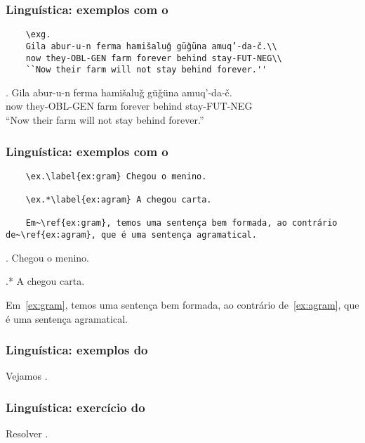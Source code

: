 \begin{frame}[fragile]
  \frametitle{Linguística: exemplos com o }
  \small

  \begin{verbatim}
    \exg.
    Gila abur-u-n ferma hamišaluǧ güǧüna amuq’-da-č.\\
    now they-OBL-GEN farm forever behind stay-FUT-NEG\\
    ``Now their farm will not stay behind forever.''
  \end{verbatim}

  \exg.
  Gila abur-u-n ferma hamišaluǧ güǧüna amuq’-da-č.\\
  now they-OBL-GEN farm forever behind stay-FUT-NEG\\
  ``Now their farm will not stay behind forever.''

\end{frame}

\begin{frame}[fragile]
  \frametitle{Linguística: exemplos com o }
  \normalsize

  \begin{verbatim}
    \ex.\label{ex:gram} Chegou o menino.

    \ex.*\label{ex:agram} A chegou carta.

    Em~\ref{ex:gram}, temos uma sentença bem formada, ao contrário de~\ref{ex:agram}, que é uma sentença agramatical.
  \end{verbatim}

  \vfill

  \ex.\label{ex:gram} Chegou o menino.

  \ex.*\label{ex:agram} A chegou carta.

  Em~\ref{ex:gram}, temos uma sentença bem formada, ao contrário
  de~\ref{ex:agram}, que é uma sentença agramatical.

\end{frame}

\begin{frame}
  \frametitle{Linguística: exemplos do }
  \huge
  Vejamos .
\end{frame}

\begin{frame}
  \frametitle{Linguística: exercício do }
  \huge
  Resolver .
\end{frame}
